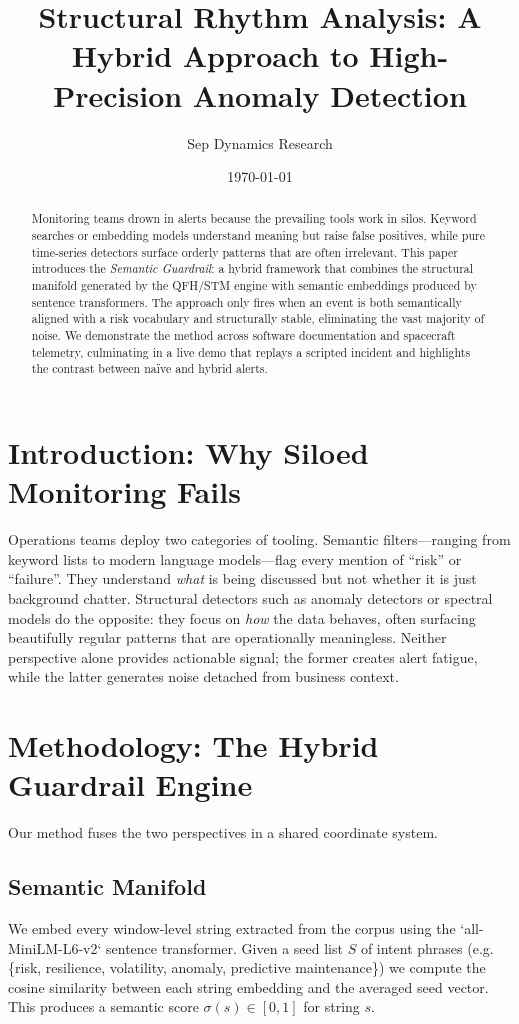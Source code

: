 \documentclass[11pt]{article}
\title{Structural Rhythm Analysis: A Hybrid Approach to High-Precision Anomaly Detection}
\author{Sep Dynamics Research}
\date{\today}
\begin{document}
\maketitle

\begin{abstract}
Monitoring teams drown in alerts because the prevailing tools work in silos. Keyword
searches or embedding models understand meaning but raise false positives, while
pure time-series detectors surface orderly patterns that are often irrelevant.
This paper introduces the \emph{Semantic Guardrail}: a hybrid framework that
combines the structural manifold generated by the QFH/STM engine with semantic
embeddings produced by sentence transformers. The approach only fires when an
event is both semantically aligned with a risk vocabulary and structurally
stable, eliminating the vast majority of noise. We demonstrate the method across
software documentation and spacecraft telemetry, culminating in a live demo that
replays a scripted incident and highlights the contrast between naïve and hybrid
alerts.
\end{abstract}

\section{Introduction: Why Siloed Monitoring Fails}
Operations teams deploy two categories of tooling. Semantic filters---ranging
from keyword lists to modern language models---flag every mention of ``risk'' or
``failure''. They understand \emph{what} is being discussed but not whether it is
just background chatter. Structural detectors such as anomaly detectors or
spectral models do the opposite: they focus on \emph{how} the data behaves, often
surfacing beautifully regular patterns that are operationally meaningless.
Neither perspective alone provides actionable signal; the former creates alert
fatigue, while the latter generates noise detached from business context.

\section{Methodology: The Hybrid Guardrail Engine}
Our method fuses the two perspectives in a shared coordinate system.

\subsection{Semantic Manifold}
We embed every window-level string extracted from the corpus using the
`all-MiniLM-L6-v2` sentence transformer. Given a seed list $S$ of intent phrases
(e.g. \{risk, resilience, volatility, anomaly, predictive maintenance\}) we
compute the cosine similarity between each string embedding and the averaged
seed vector. This produces a semantic score $\sigma(s) \in [0, 1]$ for string
$s$.
\end{document}
